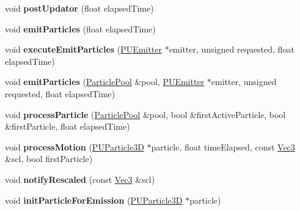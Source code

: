 \begin{DoxyCompactItemize}
\mbox{\label{classPUParticleSystem3D_a01037ad5f1d5cc9b5557793ac2a776ac}} 
void {\bfseries post\+Updator} (float elapsed\+Time)
\item 
\mbox{\label{classPUParticleSystem3D_a9d8010d75a50cb5ceab238ba95f7dce6}} 
void {\bfseries emit\+Particles} (float elapsed\+Time)
\item 
\mbox{\label{classPUParticleSystem3D_aaac18cd6cad329331154af1220e56863}} 
void {\bfseries execute\+Emit\+Particles} (\hyperlink{classPUEmitter}{P\+U\+Emitter} $\ast$emitter, unsigned requested, float elapsed\+Time)
\item 
\mbox{\label{classPUParticleSystem3D_a76b10e70bfe82f17057e7a3da5330c28}} 
void {\bfseries emit\+Particles} (\hyperlink{classDataPool}{Particle\+Pool} \&pool, \hyperlink{classPUEmitter}{P\+U\+Emitter} $\ast$emitter, unsigned requested, float elapsed\+Time)
\item 
\mbox{\label{classPUParticleSystem3D_a3578d30c831b28d0c78d8b68c32fc1e0}} 
void {\bfseries process\+Particle} (\hyperlink{classDataPool}{Particle\+Pool} \&pool, bool \&first\+Active\+Particle, bool \&first\+Particle, float elapsed\+Time)
\item 
\mbox{\label{classPUParticleSystem3D_aa1ce823834d5c5a76f98794b3f1f4bf1}} 
void {\bfseries process\+Motion} (\hyperlink{structPUParticle3D}{P\+U\+Particle3D} $\ast$particle, float time\+Elapsed, const \hyperlink{classVec3}{Vec3} \&scl, bool first\+Particle)
\item 
\mbox{\label{classPUParticleSystem3D_a3ac2e314ae639c48f8f2337bab154f9b}} 
void {\bfseries notify\+Rescaled} (const \hyperlink{classVec3}{Vec3} \&scl)
\item 
\mbox{\label{classPUParticleSystem3D_a8ad9ce6e1e36f69948cbd73cfb0056b5}} 
void {\bfseries init\+Particle\+For\+Emission} (\hyperlink{structPUParticle3D}{P\+U\+Particle3D} $\ast$particle)
\item 
\mbox{\label{classPUParticleSystem3D_af3b1378bee6fa5d3eaa4bc449be8828f}} 

\end{DoxyCompactItemize}
